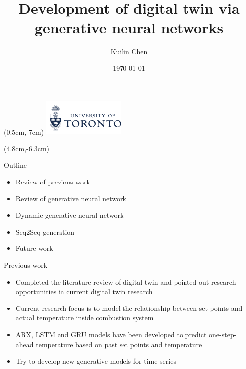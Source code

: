 \documentclass [aspectratio=169]{beamer}
\title[]{Development of digital twin via generative neural networks}
\author[]{Kuilin Chen}
\date{\today}
\begin{document}
{
\begin{frame}
    \titlepage
    \begin{textblock*}{4cm}(0.5cm,-7cm)
        \includegraphics[width=4cm]{logo_uoft.png}
    \end{textblock*}
    \begin{textblock*}{4cm}(4.8cm,-6.3cm)
        \huge \color{uoftblue}{$\vert$ Engineering}
    \end{textblock*}
\end{frame}
}

\begin{frame}{Outline}
    \begin{itemize}
    	\item Review of previous work
        \item Review of generative neural network
        \item Dynamic generative neural network
        \item Seq2Seq generation
        \item Future work
    \end{itemize}
    
\end{frame}

\begin{frame}{Previous work}
    \begin{itemize}
        \item Completed the literature review of digital twin and pointed out research opportunities in current digital twin research
        \item Current research focus is to model the relationship between set points and actual temperature inside combustion system
        \item ARX, LSTM and GRU models have been developed to predict one-step-ahead temperature based on past set points and temperature 
        \item Try to develop new generative models for time-series 
    \end{itemize}
\end{frame}
\end{document}
